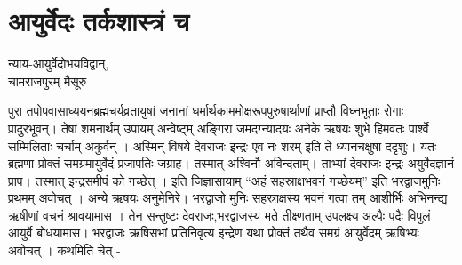 \chapter{आयुर्वेदः तर्कशास्त्रं च}

\begin{center}
\smallskip

न्याय-आयुर्वेदोभयविद्वान्,\\
चामराजपुरम् मैसूरु
\end{center}

पुरा तपोपवासाध्ययनब्रह्मचर्यव्रतायुषां जनानां धर्मार्थकाममोक्षरूपपुरुषार्थाणां प्राप्तौ विघ्नभूताः रोगाः प्रादुरभूवन्। तेषां शमनार्थम् उपायम् अन्वेष्ट्म् अङ्गिरा जमदग्न्यादयः अनेके ऋषयः शुभे हिमवतः पार्श्वे सम्मिलिताः चर्चाम् अकुर्वन् । अस्मिन् विषये देवराजः इन्द्रः एव नः शरम् इति ते ध्यानचक्षुषा ददृशुः। यतः ब्रह्मणा प्रोक्तं समग्रमायुर्वेदं प्रजापतिः जग्राह। तस्मात् अश्विनौ अविन्दताम्। ताभ्यां देवराजः इन्द्रः अयुर्वेदज्ञानं प्राप। तस्मात् इन्द्रसमीपं को गच्छेत् । इति जिज्ञासायाम् “अहं सहस्राक्षभवनं गच्छेयम्” इति भरद्वाजमुनिः प्रथमम् अवोचत् । अन्ये ऋषयः अनुमेनिरे। भरद्वाजो मुनिः सहस्राक्षस्य भवनं गत्वा तम् आशीर्भिः अभिनन्द्य ऋषीणां वचनं श्रावयामास । तेन सन्तुष्टः देवराजः,भरद्वाजस्य मते तीक्ष्णताम् उपलक्ष्य अल्पैः पदैः विपुलं आयुर्वे बोधयामास। भरद्वाजः ऋषिसभां प्रतिनिवृत्य इन्द्रेण यथा प्रोक्तं तथैव समग्रं आयुर्वेदम् ऋषिभ्यः अवोचत् । कथमिति चेत् -
